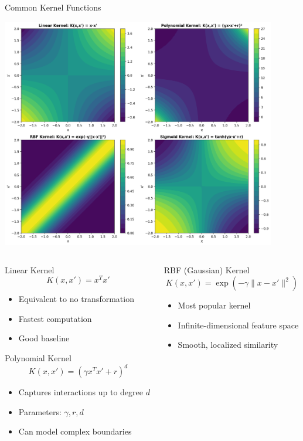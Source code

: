 \documentclass[8pt,aspectratio=1610]{beamer}
\begin{document}
\begin{frame}{Common Kernel Functions}
\begin{center}
\includegraphics[width=0.9\textwidth]{../figures/kernel_functions.png}
\end{center}

\begin{columns}[t]
\begin{column}{0.48\textwidth}
\begin{block}{Linear Kernel}
$$K(x, x') = x^T x'$$
\begin{itemize}
\setlength{\itemsep}{1pt}
\item Equivalent to no transformation
\item Fastest computation
\item Good baseline
\end{itemize}
\end{block}

\begin{block}{Polynomial Kernel}
$$K(x, x') = (\gamma x^T x' + r)^d$$
\begin{itemize}
\setlength{\itemsep}{1pt}
\item Captures interactions up to degree $d$
\item Parameters: $\gamma, r, d$
\item Can model complex boundaries
\end{itemize}
\end{block}
\end{column}

\begin{column}{0.48\textwidth}
\begin{block}{RBF (Gaussian) Kernel}
$$K(x, x') = \exp\left(-\gamma \|x - x'\|^2\right)$$
\begin{itemize}
\setlength{\itemsep}{1pt}
\item Most popular kernel
\item Infinite-dimensional feature space
\item Smooth, localized similarity
\end{itemize}
\end{block}


\end{column}
\end{columns}
\end{frame}
\end{document}
